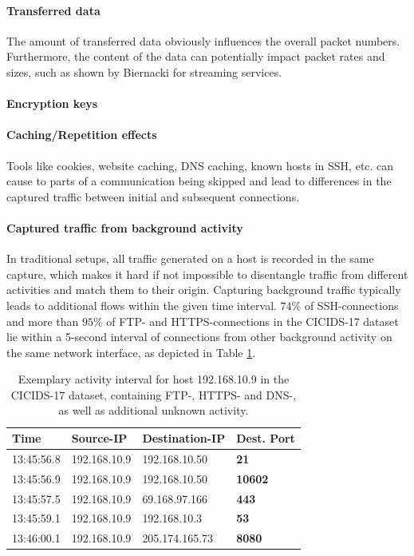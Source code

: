 \documentclass{article}
\begin{document}
\paragraph{Transferred data} 
The amount of transferred data obviously influences the overall packet numbers. Furthermore, the content of the data can potentially impact packet rates and sizes, such as shown by Biernacki \cite{biernacki2017analysis} for streaming services.

\paragraph{Encryption keys}


\paragraph{Caching/Repetition effects}
Tools like cookies, website caching, DNS caching, known hosts in SSH, etc. can cause to parts of a communication being skipped and lead to differences in the captured traffic between initial and subsequent connections.

\paragraph{Captured traffic from background activity} 
In traditional setups, all traffic generated on a host is recorded in the same capture, which makes it hard if not impossible to disentangle traffic from different activities and match them to their origin. Capturing background traffic typically leads to additional flows within the given time interval. $74\%$ of SSH-connections and more than $95\%$ of FTP- and HTTPS-connections in the CICIDS-17 dataset lie within a 5-second interval of connections from other background activity on the same network interface, as depicted in Table \ref{Tab:Sess}.

\begin{table}[h!]
\centering
\begin{tabular}{l|l|l|>{\bfseries}l}
Time&  Source-IP &Destination-IP& Dest. Port\\ \hline
13:45:56.8 & 192.168.10.9 &  192.168.10.50 &       21 \\ \hline
13:45:56.9 & 192.168.10.9 &  192.168.10.50 &    10602\\ \hline
13:45:57.5 & 192.168.10.9 &  69.168.97.166 &      443\\ \hline
13:45:59.1 & 192.168.10.9 &   192.168.10.3 &       53\\ \hline
13:46:00.1 & 192.168.10.9 & 205.174.165.73 &     8080\\ \hline
\end{tabular}
\caption{Exemplary activity interval for host 192.168.10.9 in the CICIDS-17 dataset, containing FTP-, HTTPS- and DNS-, as well as additional unknown activity.}\label{Tab:Sess}
\end{table}
\end{document}
